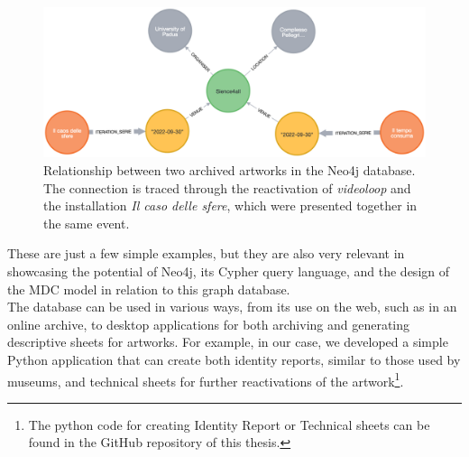 \begin{figure}[!h]
    \centering
    \includegraphics[width=\linewidth]{chapters/4-MDC_model_application/image/neo4j-event.png}
    \caption{Relationship between two archived artworks in the Neo4j database. The connection is traced through the reactivation of \textit{videoloop} and the installation \textit{Il caso delle sfere}, which were presented together in the same event.}
    \label{fig:c4-neo4j-event}
\end{figure}

These are just a few simple examples, but they are also very relevant in showcasing the potential of Neo4j, its Cypher query language, and the design of the MDC model in relation to this graph database.\\
The database can be used in various ways, from its use on the web, such as in an online archive, to desktop applications for both archiving and generating descriptive sheets for artworks. For example, in our case, we developed a simple Python application that can create both identity reports, similar to those used by museums, and technical sheets for further reactivations of the artwork\footnote{The python code for creating Identity Report or Technical sheets can be found in the GitHub repository of this thesis. }. 

